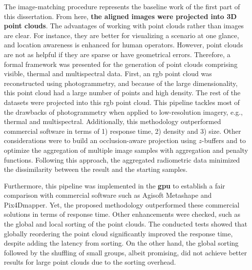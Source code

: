 The image-matching procedure represents the baseline work of the first part of this dissertation. From here, \textbf{the aligned images were projected into 3D point clouds}. The advantages of working with point clouds rather than images are clear. For instance, they are better for visualizing a scenario at one glance, and location awareness is enhanced for human operators. However, point clouds are not as helpful if they are sparse or have geometrical errors. Therefore, a formal framework was presented for the generation of point clouds comprising visible, thermal and multispectral data. First, an \acrshort{rgb} point cloud was reconstructed using photogrammetry, and because of the large dimensionality, this point cloud had a large number of points and high density. The rest of the datasets were projected into this \acrshort{rgb} point cloud. This pipeline tackles most of the drawbacks of photogrammetry when applied to low-resolution imagery, e.g., thermal and multispectral. Additionally, this methodology outperformed commercial software in terms of 1) response time, 2) density and 3) size. Other considerations were to build an occlusion-aware projection using $z$-buffers and to optimize the aggregation of multiple image samples with aggregation and penalty functions. Following this approach, the aggregated radiometric data minimized the dissimilarity between the result and the starting samples. 

Furthermore, this pipeline was implemented in the \textbf{\acrshort{gpu}} to establish a fair comparison with commercial software such as Agisoft Metashape and Pix4Dmapper. Yet, the proposed methodology outperformed these commercial solutions in terms of response time. Other enhancements were checked, such as the global and local sorting of the point clouds. The conducted tests showed that globally reordering the point cloud significantly improved the response time, despite adding the latency from sorting. On the other hand, the global sorting followed by the shuffling of small groups, albeit promising, did not achieve better results for large point clouds due to the sorting overhead. 

